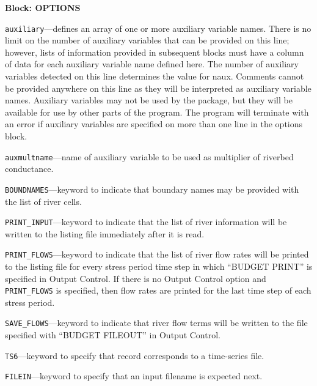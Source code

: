 
\item \textbf{Block: OPTIONS}

\begin{description}
\item \texttt{auxiliary}---defines an array of one or more auxiliary variable names.  There is no limit on the number of auxiliary variables that can be provided on this line; however, lists of information provided in subsequent blocks must have a column of data for each auxiliary variable name defined here.   The number of auxiliary variables detected on this line determines the value for naux.  Comments cannot be provided anywhere on this line as they will be interpreted as auxiliary variable names.  Auxiliary variables may not be used by the package, but they will be available for use by other parts of the program.  The program will terminate with an error if auxiliary variables are specified on more than one line in the options block.

\item \texttt{auxmultname}---name of auxiliary variable to be used as multiplier of riverbed conductance.

\item \texttt{BOUNDNAMES}---keyword to indicate that boundary names may be provided with the list of river cells.

\item \texttt{PRINT\_INPUT}---keyword to indicate that the list of river information will be written to the listing file immediately after it is read.

\item \texttt{PRINT\_FLOWS}---keyword to indicate that the list of river flow rates will be printed to the listing file for every stress period time step in which ``BUDGET PRINT'' is specified in Output Control.  If there is no Output Control option and \texttt{PRINT\_FLOWS} is specified, then flow rates are printed for the last time step of each stress period.

\item \texttt{SAVE\_FLOWS}---keyword to indicate that river flow terms will be written to the file specified with ``BUDGET FILEOUT'' in Output Control.

\item \texttt{TS6}---keyword to specify that record corresponds to a time-series file.

\item \texttt{FILEIN}---keyword to specify that an input filename is expected next.


\end{description}

